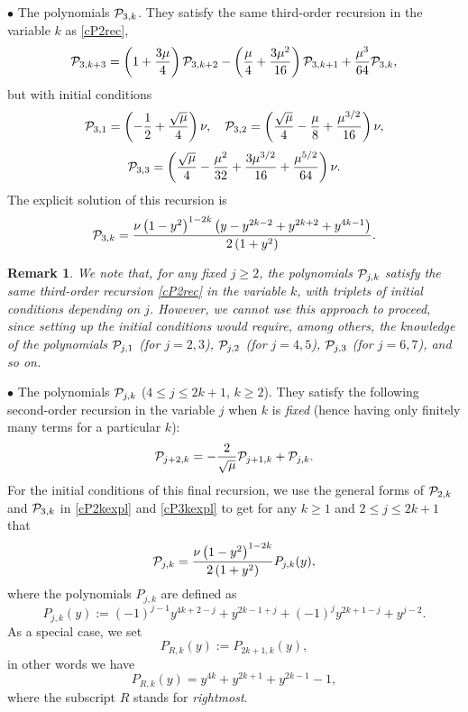 \documentclass[a4paper]{article}
\newtheorem{remark}{Remark}
\newcommand{\Por}{P_{R,k}(y)}
\newcommand{\cP}{{\cal{P}}}
\begin{document}
$\bullet$  The polynomials $\cP_{3,k}$. They satisfy the same third-order recursion in the variable $k$ as \eqref{cP2rec},
\[
\cP_{3,k+3}=\left(1+\frac{3\mu}{4}\right)\cP_{3,k+2}-\left(\frac{\mu }{4}+\frac{3 \mu ^2}{16}\right)\cP_{3,k+1}+\frac{\mu ^3}{64}\cP_{3,k},
\]
but with initial conditions 
\[
\cP_{3,1}=\left(-\frac{1}{2}+\frac{\sqrt{\mu }}{4}\right) \nu, \quad \cP_{3,2}=\left(\frac{\sqrt{\mu} }{4}-\frac{\mu}{8}+\frac{\mu ^{3/2}}{16}\right) \nu,
\]
\[
\cP_{3,3}=\left(\frac{\sqrt{\mu }}{4}-\frac{\mu ^2}{32}+\frac{3 \mu ^{3/2}}{16}+\frac{\mu ^{5/2}}{64}\right) \nu.
\]
The explicit solution of this recursion is
\begin{equation}\label{cP3kexpl}
\cP_{3,k}=\frac{\nu  \left(1-y^2\right)^{1-2 k} \left(y-y^{2 k-2}+y^{2 k+2}+y^{4 k-1}\right)}{2 \left(1+y^2\right)}.
\end{equation}
\begin{remark}
We note that, for any \emph{fixed} $j\ge 2$, the polynomials $\cP_{j,k}$ satisfy the same third-order recursion \eqref{cP2rec} in the variable $k$, with triplets of initial conditions depending on $j$. However, we cannot use this approach to proceed, since setting up the initial conditions would require, among others, the knowledge of the  polynomials $\cP_{j,1}$ (for $j=2, 3$),  $\cP_{j,2}$ (for $j=4, 5$), $\cP_{j,3}$ (for $j=6, 7$), and so on. 
\end{remark}



$\bullet$  The polynomials $\cP_{j,k}$ ($4\le j\le 2k+1$, $k\ge 2$). They satisfy the following second-order recursion in the variable $j$ when $k$ is \emph{fixed} (hence having only finitely many terms for a particular $k$):  
\[
\cP_{j+2,k}=-\frac{2}{\sqrt{\mu }}\cP_{j+1,k}+\cP_{j,k}.
\]
For the initial conditions of this final recursion, we use the general forms of $\cP_{2,k}$ and $\cP_{3,k}$ in \eqref{cP2kexpl} and \eqref{cP3kexpl} to get for any $k\ge 1$ and $2\le j\le 2k+1$ that 
\begin{equation}\label{Pjkexpl}
\cP_{j,k}=\frac{\nu  \left(1-y^2\right)^{1-2 k}}{2 \left(1+y^2\right)}P_{j,k}(y), 
\end{equation}
where the polynomials $P_{j,k}$ are defined as
\begin{equation}\label{Pjky}
P_{j,k}(y):=(-1)^{j-1} y^{4 k+2-j}+y^{2 k-1+j}+(-1)^j y^{2 k+1-j}+y^{j-2}.
\end{equation}
As a special case, we set
\[
\Por:=P_{2k+1,k}(y),
\]
in other words we have
\begin{equation}\label{pordef}
\Por=y^{4 k}+y^{2 k+1}+y^{2 k-1}-1,
\end{equation}
where the subscript $R$ stands for \textit{rightmost}.
\end{document}
